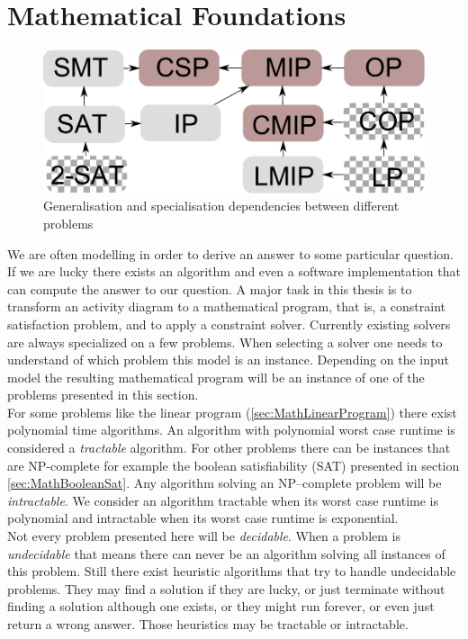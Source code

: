 \section{Mathematical Foundations}
\label{sec:Maths}
\begin{figure}
\label{fig:problemLatice}
\includegraphics[width=\textwidth]{./pics/ProblemLatice.pdf}
\caption{Generalisation and specialisation dependencies between different problems}
\end{figure}
We are often modelling in order to derive an answer to some particular question. If we are lucky there exists an algorithm and even a software implementation that can compute the answer to our question. A major task in this thesis is to transform an activity diagram to a mathematical program, that is, a constraint satisfaction problem, and to apply a constraint solver. Currently existing solvers are always specialized on a few problems. When selecting a solver one needs to understand of which problem this model is an instance. Depending on the input model the resulting mathematical program will be an instance of one of the problems presented in this section.\\
For some problems like the linear program (\ref{sec:MathLinearProgram}) there exist polynomial time algorithms. An algorithm with polynomial worst case runtime is considered a \emph{tractable} algorithm. For other problems there can be instances that are NP-complete for example the boolean satisfiability (SAT) presented in section \ref{sec:MathBooleanSat}. Any algorithm solving an NP--complete problem will be \emph{intractable}. We consider an algorithm tractable when its worst case runtime is polynomial and intractable when its worst case runtime is exponential.\\
Not every problem presented here will be \emph{decidable}. When a problem is \emph{undecidable} that means there can never be an algorithm solving all instances of this problem. Still there exist heuristic algorithms that try to handle undecidable problems. They may find a solution if they are lucky, or just terminate without finding a solution although one exists, or they might run forever, or even just return a wrong answer. Those heuristics may be tractable or intractable.\\
